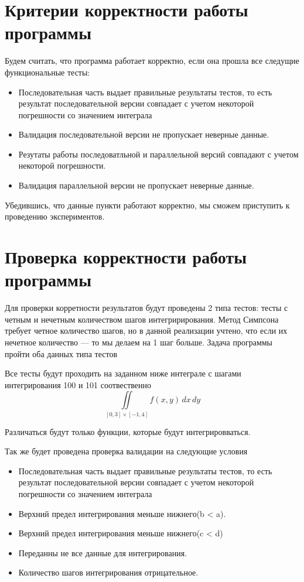 \documentclass[12pt,a4paper]{article}
\begin{document}
\section*{Критерии корректности работы программы}

Будем считать, что программа работает корректно, если она прошла все следущие функциональные тесты:
\begin{itemize}
    \item Последовательная часть выдает правильные результаты тестов, то есть результат последовательной версии совпадает с учетом некоторой погрешности со значением интеграла
    \item Валидация последовательной версии не пропускает неверные данные.
    \item Резутаты работы последоватльной и параллельной версий совпадают с учетом некоторой погрешности.
    \item Валидация параллельной версии не пропускает неверные данные.
\end{itemize}

Убедившись, что данные пункти работают корректно, мы сможем приступить к проведению экспериментов.

\section*{Проверка корректности работы программы}

Для проверки корретности результатов будут проведены 2 типа тестов: тесты с четным и нечетным количеством шагов интегририрования. Метод Симпсона требует четное количество шагов, но в данной реализации учтено, что если их нечетное количество --- то мы делаем на 1 шаг больше. Задача программы пройти оба данных типа тестов

Все тесты будут проходить на заданном ниже интеграле с шагами интегрирования 100 и 101 соотвественно
\[
\iint\limits_{[0, 3] \times [-1, 4]} f(x, y) \, dx \, dy
\]

Различаться будут только функции, которые будут интегрировваться.

Так же будет проведена проверка валидации на следующие условия
\begin{itemize}
    \item Последовательная часть выдает правильные результаты тестов, то есть результат последовательной версии совпадает с учетом некоторой погрешности со значением интеграла
    \item Верхний предел интегрирования меньше нижнего(b < a).
    \item Верхний предел интегрирования меньше нижнего(c < d)
    \item Переданны не все данные для интегрирования.
    \item Количество шагов интегрирования отрицательное.
\end{itemize}
\end{document}
